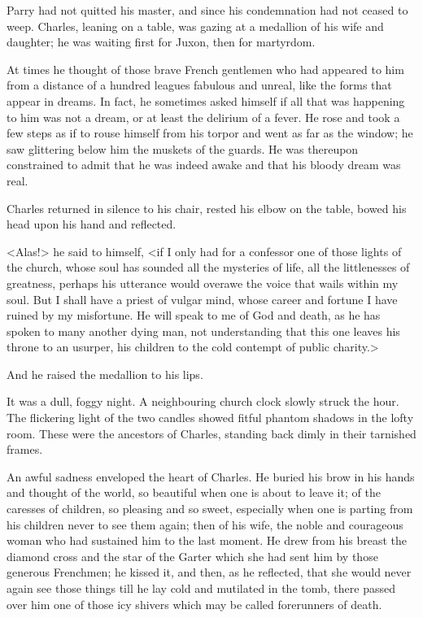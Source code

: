 Parry had not quitted his master, and since his condemnation had not ceased to weep. Charles, leaning on a table, was gazing at a medallion of his wife and daughter; he was waiting first for Juxon, then for martyrdom.

At times he thought of those brave French gentlemen who had appeared to him from a distance of a hundred leagues fabulous and unreal, like the forms that appear in dreams. In fact, he sometimes asked himself if all that was happening to him was not a dream, or at least the delirium of a fever. He rose and took a few steps as if to rouse himself from his torpor and went as far as the window; he saw glittering below him the muskets of the guards. He was thereupon constrained to admit that he was indeed awake and that his bloody dream was real.

Charles returned in silence to his chair, rested his elbow on the table, bowed his head upon his hand and reflected.

<Alas!> he said to himself, <if I only had for a confessor one of those lights of the church, whose soul has sounded all the mysteries of life, all the littlenesses of greatness, perhaps his utterance would overawe the voice that wails within my soul. But I shall have a priest of vulgar mind, whose career and fortune I have ruined by my misfortune. He will speak to me of God and death, as he has spoken to many another dying man, not understanding that this one leaves his throne to an usurper, his children to the cold contempt of public charity.>

And he raised the medallion to his lips.

It was a dull, foggy night. A neighbouring church clock slowly struck the hour. The flickering light of the two candles showed fitful phantom shadows in the lofty room. These were the ancestors of Charles, standing back dimly in their tarnished frames.

An awful sadness enveloped the heart of Charles. He buried his brow in his hands and thought of the world, so beautiful when one is about to leave it; of the caresses of children, so pleasing and so sweet, especially when one is parting from his children never to see them again; then of his wife, the noble and courageous woman who had sustained him to the last moment. He drew from his breast the diamond cross and the star of the Garter which she had sent him by those generous Frenchmen; he kissed it, and then, as he reflected, that she would never again see those things till he lay cold and mutilated in the tomb, there passed over him one of those icy shivers which may be called forerunners of death.

